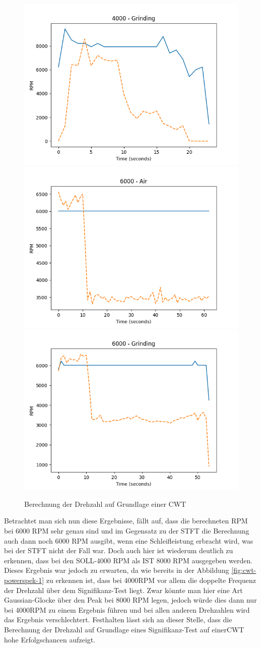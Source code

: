 \begin{figure}[H]
    \includegraphics[width=0.5\linewidth]{Studienarbeit//images/cwt-rpm-4000-grinding.png} 
    \includegraphics[width=0.5\linewidth]{Studienarbeit//images/cwt-rpm-6000-air.png}    
    \includegraphics[width=0.5\linewidth]{Studienarbeit//images/cwt-rpm-6000-grinding.png}    
    \caption{Berechnung der Drehzahl auf Grundlage einer CWT}
    \label{fig:cwt-rpm}
\end{figure}


Betrachtet man sich nun diese Ergebnisse, fällt auf, dass die berechneten RPM bei 6000 RPM sehr genau sind und im Gegensatz zu der \ac{STFT} die Berechnung auch dann noch 6000 RPM ausgibt, wenn eine Schleifleistung erbracht wird, was bei der \ac{STFT} nicht der Fall war. Doch auch hier ist wiederum deutlich zu erkennen, dass bei den SOLL-4000 RPM als IST 8000 RPM ausgegeben werden. Dieses Ergebnis war jedoch zu erwarten, da wie bereits in der Abbildung \ref{fig:cwt-powerspek-1} zu erkennen ist, dass bei 4000RPM vor allem die doppelte Frequenz der Drehzahl über dem Signifikanz-Test liegt. Zwar könnte man hier eine Art Gaussian-Glocke über den Peak bei 8000 RPM legen, jedoch würde dies dann nur bei 4000RPM zu einem Ergebnis führen und bei allen anderen Drehzahlen wird das Ergebnis verschlechtert. Festhalten lässt sich an dieser Stelle, dass die Berechnung der Drehzahl auf Grundlage eines Signifikanz-Test auf einer\ac{CWT} hohe Erfolgschancen aufzeigt.



